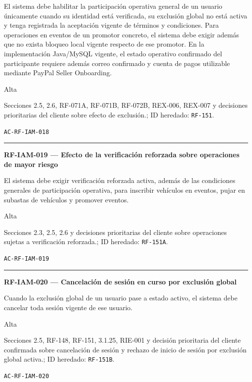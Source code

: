 \documentclass[10pt,letterpaper]{article}
\begin{document}
\begin{description}[style=nextline,leftmargin=3.15cm,labelwidth=2.8cm,font=\normalfont\bfseries]
\item[Obligación] El sistema debe habilitar la participación operativa general de un usuario únicamente cuando su identidad está verificada, su exclusión global no está activa y tenga registrada la aceptación vigente de términos y condiciones. Para operaciones en eventos de un promotor concreto, el sistema debe exigir además que no exista bloqueo local vigente respecto de ese promotor. En la implementación Java/MySQL vigente, el estado operativo confirmado del participante requiere además correo confirmado y cuenta de pagos utilizable mediante PayPal Seller Onboarding.
\item[Prioridad] Alta
\item[Procedencia] Secciones 2.5, 2.6, RF-071A, RF-071B, RF-072B, REX-006, REX-007 y decisiones prioritarias del cliente sobre efecto de exclusión.; ID heredado: \texttt{RF-151}.
\item[Verificación] \texttt{AC-RF-IAM-018}
\end{description}
\vspace{0.25em}\hrule\vspace{0.65em}
\noindent\textbf{RF-IAM-019 --- Efecto de la verificación reforzada sobre operaciones de mayor riesgo}\par
\begin{description}[style=nextline,leftmargin=3.15cm,labelwidth=2.8cm,font=\normalfont\bfseries]
\item[Obligación] El sistema debe exigir verificación reforzada activa, además de las condiciones generales de participación operativa, para inscribir vehículos en eventos, pujar en subastas de vehículos y promover eventos.
\item[Prioridad] Alta
\item[Procedencia] Secciones 2.3, 2.5, 2.6 y decisiones prioritarias del cliente sobre operaciones sujetas a verificación reforzada.; ID heredado: \texttt{RF-151A}.
\item[Verificación] \texttt{AC-RF-IAM-019}
\end{description}
\vspace{0.25em}\hrule\vspace{0.65em}
\noindent\textbf{RF-IAM-020 --- Cancelación de sesión en curso por exclusión global}\par
\begin{description}[style=nextline,leftmargin=3.15cm,labelwidth=2.8cm,font=\normalfont\bfseries]
\item[Obligación] Cuando la exclusión global de un usuario pase a estado activo, el sistema debe cancelar toda sesión vigente de ese usuario.
\item[Prioridad] Alta
\item[Procedencia] Secciones 2.5, RF-148, RF-151, 3.1.25, RIE-001 y decisión prioritaria del cliente confirmada sobre cancelación de sesión y rechazo de inicio de sesión por exclusión global activa.; ID heredado: \texttt{RF-151B}.
\item[Verificación] \texttt{AC-RF-IAM-020}
\end{description}
\end{document}
